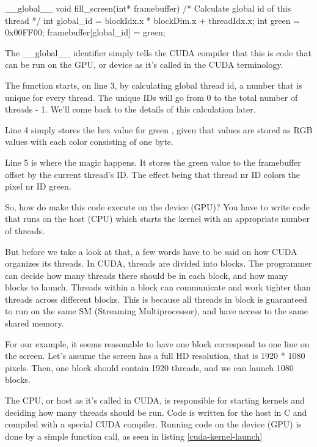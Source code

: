 \documentclass[../main/report.tex]{subfiles}
\begin{document}
\begin{c-code}[caption=A CUDA kernel filling a single pixel with green, label=sequential-green]
__global__ void fill_screen(int* framebuffer){
	/* Calculate global id of this thread */
	int global_id = blockIdx.x * blockDim.x + threadIdx.x; 
	int green     = 0x00FF00;
	framebuffer[global_id] = green;
}
\end{c-code}

The \_\_global\_\_ identifier simply tells the CUDA compiler that this is code that can be run on the GPU, or device as it's called in the CUDA terminology.

The function starts, on line 3, by calculating global thread id, a number that is unique for every thread. 
The unique IDs will go from 0 to the total number of threads - 1.
We'll come back to the details of this calculation later.

Line 4 simply stores the hex value for green
, given that values are stored as RGB values with each color consisting of one byte.

Line 5 is where the magic happens. 
It stores the green value to the framebuffer offset by the current thread's ID.
The effect being that thread nr ID colors the pixel nr ID green.

So, how do make this code execute on the device (GPU)?
You have to write code that runs on the host (CPU) which starts the kernel with an appropriate number of threads.

But before we take a look at that, a few words have to be said on how CUDA organizes its threads.
In CUDA, threads are divided into blocks. 
The programmer can decide how many threads there should be in each block, and how many blocks to launch.
Threads within a block can communicate and work tighter than threads across different blocks. 
This is because all threads in block is guaranteed to run on the same SM (Streaming Multiprocessor), and have access to the same shared memory.

For our example, it seems reasonable to have one block correspond to one line on the screen.
Let's assume the screen has a full HD resolution, that is 1920 * 1080 pixels.
Then, one block should contain 1920 threads, and we can launch 1080 blocks.

The CPU, or host as it's called in CUDA, is responsible for starting kernels and deciding how many threads should be run.
Code is written for the host in C and compiled with a special CUDA compiler.
Running code on the device (GPU) is done by a simple function call, as seen in listing \ref{cuda-kernel-launch}
\end{document}
